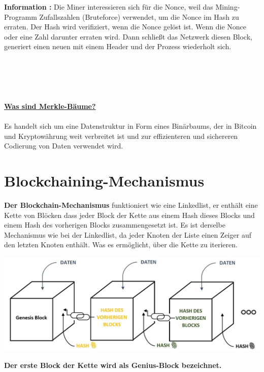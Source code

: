 \documentclass[ngerman]{scrreprt}
\begin{document}
\color{green}
\huge{\textbf{Information :}} 
\color{black}
\normalsize
Die Miner interessieren sich für die Nonce, weil das Mining-Programm Zufallszahlen (Bruteforce) verwendet, um die Nonce im Hash zu erraten. Der Hash wird verifiziert, wenn die Nonce gelöst ist. Wenn die Nonce oder eine Zahl darunter erraten wird. Dann schließt das Netzwerk diesen Block, generiert einen neuen mit einem Header und der Prozess wiederholt sich. \\ \\ \\ \\ \\ \\

\large
\underline{\textbf{Was sind Merkle-Bäume?}} \\ \\
\normalsize
Es handelt sich um eine Datenstruktur in Form eines Binärbaums, der in Bitcoin und Kryptowährung weit verbreitet ist und zur effizienteren und sichereren Codierung von Daten verwendet wird.




\section{Blockchaining-Mechanismus}
\textbf{Der Blockchain-Mechanismus} funktioniert wie eine Linkedlist, er enthält eine Kette von Blöcken
dass jeder Block der Kette aus einem Hash dieses Blocks und einem Hash des vorherigen Blocks zusammengesetzt ist. Es ist derselbe Mechanismus wie bei der Linkedlist, da jeder Knoten der Liste einen Zeiger auf den letzten Knoten enthält. Was es ermöglicht, über die Kette zu iterieren.

\includegraphics[width=\linewidth]{2}


\textbf{Der erste Block der Kette wird als Genius-Block bezeichnet.} \\ \\ \\
\end{document}
